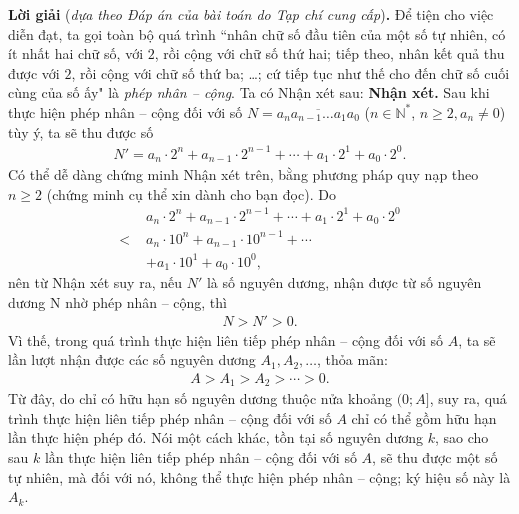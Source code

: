 \begin{multicols}{2}
	\vskip 0.05cm
	\textbf{\color{thachthuctoanhoc}Lời giải} (\textit{dựa theo Đáp án của bài toán do Tạp chí cung cấp})\textbf{\color{thachthuctoanhoc}.}
	\vskip 0.05cm
	Để tiện cho việc diễn đạt, ta gọi toàn bộ quá trình ``nhân chữ số đầu tiên của một số tự nhiên, có ít nhất hai chữ số, với $2$, rồi cộng với chữ số thứ hai; tiếp theo, nhân kết quả thu được với $2$, rồi cộng với chữ số thứ ba; \ldots; cứ tiếp tục như thế cho đến chữ số cuối cùng của số ấy" là \textit{phép nhân -- cộng}.
	\vskip 0.05cm
	Ta có Nhận xét sau:
	\vskip 0.01cm
	\textbf{\color{thachthuctoanhoc}Nhận xét.} Sau khi thực hiện phép nhân -- cộng đối với số $N \!=\! \overline {{a_n}{a_{n - 1}} \ldots {a_1}{a_0}} $ ($n \!\in\! \mathbb{N^*}$, $n \ge 2, a_n \ne 0$) tùy ý, ta sẽ thu được số
	\begin{align*}
		N' \!=\! {a_n} \!\cdot\! {2^n} \!+\! {a_{n \!-\! 1}} \!\cdot\! {2^{n \!-\! 1}} \!+\!  \!\cdots\!  +\! {a_1} \!\cdot\! {2^1} \!+\! {a_0} \!\cdot\! {2^0}.
	\end{align*}
	Có thể dễ dàng chứng minh Nhận xét trên, bằng phương pháp quy nạp theo $n \ge 2$ (chứng minh cụ thể xin dành cho bạn đọc).
	\vskip 0.01cm
	Do
	\begin{align*}
		&{a_n} \!\cdot\! {2^n} \!+\! {a_{n - 1}} \!\cdot\! {2^{n \!-\! 1}} \!+\!  \cdots  \!+\! {a_1} \!\cdot\! {2^1} \!+\! {a_0} \!\cdot\! {2^0} \\[-0.4ex]
		< \,\,&{a_n} \cdot {10^n} + {a_{n - 1}} \cdot {10^{n - 1}} +  \cdots  \\[-0.4ex]
		&+ {a_1} \cdot {10^1} + {a_0} \cdot {10^0},
	\end{align*}
	nên từ Nhận xét suy ra, nếu $N'$  là số nguyên dương, nhận được từ số nguyên dương N nhờ phép nhân -- cộng, thì
	\begin{align*}
		N > N' > 0.
	\end{align*}
	Vì thế, trong quá trình thực hiện liên tiếp phép nhân -- cộng đối với số $A$, ta sẽ lần lượt nhận được các số nguyên dương   $A_1, A_2, \ldots$, thỏa mãn:
	\begin{align*}
		A > {A_1} > {A_2} >  \cdots  > 0.
	\end{align*}
	Từ đây, do chỉ có hữu hạn số nguyên dương thuộc nửa khoảng $(0; A]$, suy ra, quá trình thực hiện liên tiếp phép nhân -- cộng đối với số $A$ chỉ có thể gồm hữu hạn lần thực hiện phép đó. Nói một cách khác, tồn tại số nguyên dương $k$, sao cho sau $k$ lần thực hiện liên tiếp phép nhân -- cộng đối với số $A$, sẽ thu được một số tự nhiên, mà đối với nó, không thể thực hiện phép nhân -- cộng; ký hiệu số này là $A_k$.
	\vskip 0.01cm

\end{multicols}
